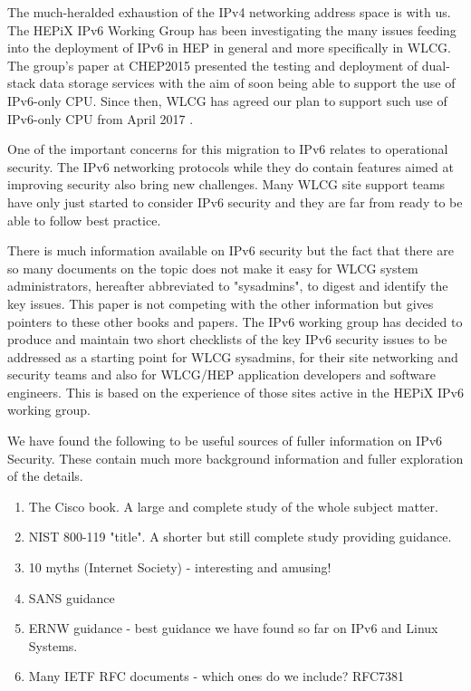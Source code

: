 The much-heralded exhaustion of the IPv4 networking address space is with us. The HEPiX
IPv6 Working Group \cite{ipv6wg} has been investigating the many issues feeding into the deployment of IPv6 in HEP in general and more specifically in WLCG. The group's paper at CHEP2015 \cite{ipv6chep2015} presented the testing and deployment of dual-stack data storage services with the aim of soon being able to support the use of IPv6-only CPU. Since then, WLCG has agreed our plan to support such use of IPv6-only CPU from April 2017 \cite{ipv6chep2016}.

One of the important concerns for this migration to IPv6 relates to operational security. The IPv6 networking protocols while they do contain features aimed at improving security also bring new challenges. Many WLCG site support teams have only just started to consider IPv6 security and they are far from ready to be able to follow best practice. 

There is much information available on IPv6 security but the fact that there are so many documents on the topic does not make it easy for WLCG system administrators, hereafter abbreviated to "sysadmins", to digest and identify the key issues. This paper is not competing with the other information but gives pointers to these other books and papers. The IPv6 working group has decided to produce and maintain two short checklists of the key IPv6 security issues to be addressed as a starting point for WLCG sysadmins, for their site networking and security teams and also for WLCG/HEP application developers and software engineers. This is based on the experience of those sites active in the HEPiX IPv6 working group.

We have found the following to be useful sources of fuller information on IPv6 Security. These contain much more background information and fuller exploration of the details.

\begin {enumerate}
\item The Cisco book. A large and complete study of the whole subject matter.
\item NIST 800-119 "title". A shorter but still complete study providing guidance.
\item 10 myths (Internet Society) - interesting and amusing!
\item SANS guidance
\item ERNW guidance - best guidance we have found so far on IPv6 and Linux Systems.
\item Many IETF RFC documents - which ones do we include? RFC7381
\end {enumerate}

